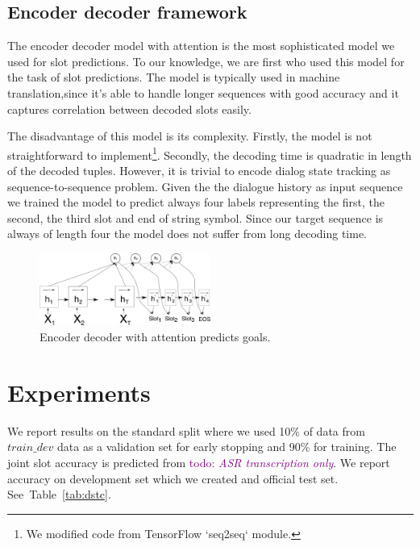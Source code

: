\documentclass{itatnew}
\def\todo#1{\textcolor{purple}{todo: \textit{#1}}}
\begin{document}
\subsection{Encoder decoder framework}
\label{sec:encdec}
The encoder decoder model with attention\cite{bahdanau2014neural} is the most sophisticated model we used for slot predictions.
To our knowledge, we are first who used this model for the task of slot predictions.
The model is typically used in machine translation,since it's able to handle longer sequences with good accuracy and it captures correlation between decoded slots easily\cite{bahdanau2014neural}.

The disadvantage of this model is its complexity.
Firstly, the model is not straightforward to implement\footnote{We modified code from TensorFlow `seq2seq` module.}. Secondly, the decoding time is quadratic in length of the decoded tuples.
However, it is trivial to encode dialog state tracking as sequence-to-sequence problem. Given the the dialogue history as input sequence we trained the model to predict always four labels representing the first, the second, the third slot and end of string symbol.
Since our target sequence is always of length four the model does not suffer from long decoding time.
\begin{figure}
\includegraphics[width=0.5\textwidth]{encdec}
\caption{Encoder decoder with attention predicts goals.}
\label{fig:encdec}
\end{figure}

\section{Experiments}
\label{sec:exp}
We report results on the standard split where we used 10\% of data from $train\_dev$ data as a validation set for early stopping\cite{prechelt1998early} and 90\% for training.
The joint slot accuracy is predicted from \todo{ASR transcription only}.
We report accuracy  on development set which we created and official test set. See~Table~\ref{tab:dstc}.
\end{document}
